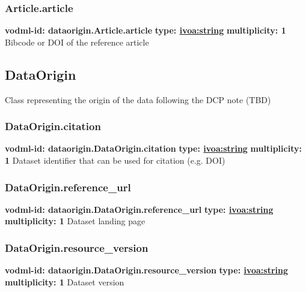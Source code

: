     \subsubsection{Article.article}
      \textbf{vodml-id: dataorigin.Article.article} \newline
      \textbf{type: \hyperref[sect:ivoa]{ivoa:string}} \newline
      \textbf{multiplicity: 1} \newline 
      Bibcode or DOI of the reference article

  \subsection{DataOrigin}
  \label{sect:dataorigin.DataOrigin}
    Class representing the origin of the data following the DCP note (TBD)

    \subsubsection{DataOrigin.citation}
      \textbf{vodml-id: dataorigin.DataOrigin.citation} \newline
      \textbf{type: \hyperref[sect:ivoa]{ivoa:string}} \newline
      \textbf{multiplicity: 1} \newline 
      Dataset identifier that can be used for citation (e.g. DOI)

    \subsubsection{DataOrigin.reference\_url}
      \textbf{vodml-id: dataorigin.DataOrigin.reference\_url} \newline
      \textbf{type: \hyperref[sect:ivoa]{ivoa:string}} \newline
      \textbf{multiplicity: 1} \newline 
      Dataset landing page

    \subsubsection{DataOrigin.resource\_version}
      \textbf{vodml-id: dataorigin.DataOrigin.resource\_version} \newline
      \textbf{type: \hyperref[sect:ivoa]{ivoa:string}} \newline
      \textbf{multiplicity: 1} \newline 
      Dataset version

